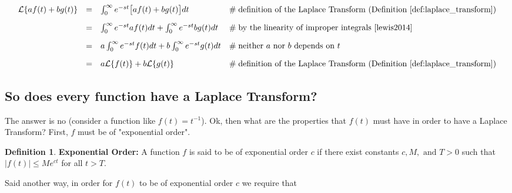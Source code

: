 \documentclass{article}
\theoremstyle{definition}
\newtheorem{definition}{Definition}[section]
\begin{document}
\smallskip
\begin{equation*}
\begin{array}{lllll}
\mathcal{L}\{af(t) + bg(t)\} 
&=& \int_0^\infty e^{-st} \big [af (t) + bg(t) \big] dt                                & \mathrel{\#} \text{definition of the Laplace Transform (Definition \ref{def:laplace_transform})}                               \\  
[10pt]                                                                                                   %
&=& \int_0^\infty e^{-st} af (t)  dt + \int_0^\infty e^{-st}  bg(t)  dt          & \mathrel{\#} \text{by the linearity of improper integrals \cite{lewis2014}}                                                                 \\
[10pt]                                                                                                   %
&=& a \int_0^\infty e^{-st}  f(t) dt + b \int_0^\infty e^{-st}  g(t) dt          & \mathrel{\#} \text{neither $a$ nor $b$ depends on $t$}                                                                                           \\
[10pt]                                                                                                   %
&=& a \mathcal{L}\{f(t)\}  + b \mathcal{L}\{g(t)\}                                   & \mathrel{\#} \text{definition of the Laplace Transform (Definition \ref{def:laplace_transform})}
\end{array}
\end{equation*}



\smallskip
\subsection{So does every function have a Laplace Transform?}
The answer is no (consider a function like $f(t) = t^{-1}$). Ok, then what are the properties that $f(t)$ must have in order to have a Laplace Transform? First, $f$ must
be of "exponential order". 


\bigskip
\begin{definition} 
{\bf Exponential Order:} A function $f$ is said to be of exponential order $c$ if there exist constants $c, M, \text{ and } T > 0$ such that $|f(t)| \leq Me^{ct}$ for all $t > T$.
\label{def:exponential_order}
\end{definition}

\bigskip
\noindent
Said another way, in order for $f(t)$ to be of exponential order $c$ we require that  
\end{document}
